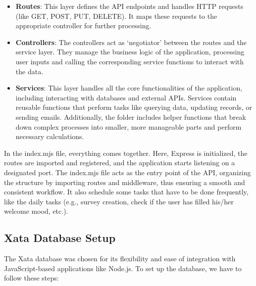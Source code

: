 \begin{itemize}
    \item \textbf{Routes}: This layer defines the API endpoints and handles HTTP requests (like GET, POST, PUT, DELETE). It maps these requests to the appropriate controller for further processing.
    \item \textbf{Controllers}: The controllers act as `negotiator' between the routes and the service layer. They manage the business logic of the application, processing user inputs and calling the corresponding service functions to interact with the data.
    \item \textbf{Services}: This layer handles all the core functionalities of the application, including interacting with databases and external APIs. Services contain reusable functions that perform tasks like querying data, updating records, or sending emails. Additionally, the folder includes helper functions that break down complex processes into smaller, more manageable parts and perform necessary calculations.
\end{itemize}

\noindent In the index.mjs file, everything comes together. Here, Express is initialized, the routes are imported and registered, and the application starts listening on a designated port. The index.mjs file acts as the entry point of the API, organizing the structure by importing routes and middleware, thus ensuring a smooth and consistent workflow. It also schedule some tasks that have to be done frequently, like the daily tasks (e.g., survey creation, check if the user has filled his/her welcome mood, etc.).

\subsection{Xata Database Setup}

The Xata database was chosen for its flexibility and ease of integration with JavaScript-based applications like Node.js. To set up the database, we have to follow these steps:

